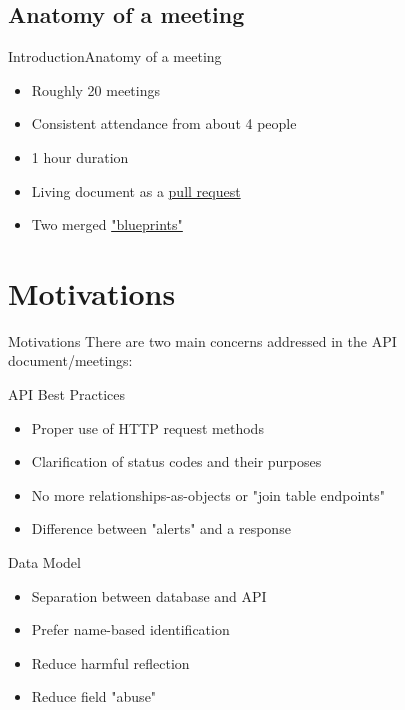 \documentclass[10pt]{beamer}
\newcommand{\chref}[2]{
	\href{#1}{{\usebeamercolor[bg]{Feather}#2}}
}
\begin{document}
\subsection{Anatomy of a meeting}
\begin{frame}{Introduction}{Anatomy of a meeting}

	\begin{itemize}
		\item Roughly 20 meetings
		\item Consistent attendance from about 4 people
		\item 1 hour duration
		\item Living document as a \chref{https://github.com/ocket8888/trafficcontrol/pull/14}{pull request}
		\item Two merged \chref{https://github.com/apache/trafficcontrol/tree/master/blueprints}{"blueprints"}
	\end{itemize}
\end{frame}

\section{Motivations}
\begin{frame}{Motivations}{}
	There are two main concerns addressed in the API document/meetings:
	\pause
	\begin{block}{API Best Practices}
	\begin{itemize}
		\item Proper use of HTTP request methods
		\item Clarification of status codes and their purposes
		\item No more relationships-as-objects or "join table endpoints"
		\item Difference between "alerts" and a response
	\end{itemize}
	\end{block}

	\begin{block}{Data Model}
	\begin{itemize}
		\item Separation between database and API
		\item Prefer name-based identification
		\item Reduce harmful reflection
		\item Reduce field "abuse"
	\end{itemize}
	\end{block}
\end{frame}
\end{document}
